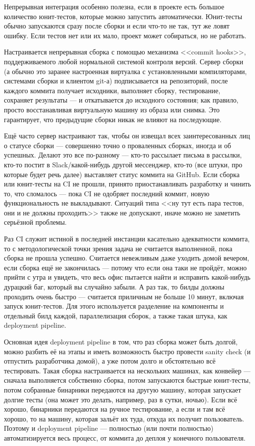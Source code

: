\documentclass{../../text-style}
\begin{document}
Непрерывная интеграция особенно полезна, если в проекте есть большое количество юнит-тестов, которые можно запустить автоматически. Юнит-тесты обычно запускаются сразу после сборки и если что-то не так, тут же ловят ошибку. Если тестов нет или их мало, проект может собираться, но не работать.

Настраивается непрерывная сборка с помощью механизма <<commit hooks>>, поддерживаемого любой нормальной системой контроля версий. Сервер сборки (а обычно это заранее настроенная виртуалка с установленными компиляторами, системами сборки и клиентом git-а) подписывается на репозиторий, после каждого коммита получает исходники, выполняет сборку, тестирование, сохраняет результаты --- и откатывается до исходного состояния; как правило, просто восстанавливая виртуальную машину из образа или снимка. Это гарантирует, что предыдущие сборки никак не влияют на последующие.

Ещё часто сервер настраивают так, чтобы он извещал всех заинтересованных лиц о статусе сборки --- совершенно точно о проваленных сборках, иногда и об успешных. Делают это все по-разному --- кто-то рассылает письма в рассылки, кто-то постит в Slack/какой-нибудь другой мессенджер, кто-то (все штуки, про которые будет речь далее) выставляет статус коммита на GitHub. Если сборка или юнит-тесты на CI не прошли, принято приостанавливать разработку и чинить то, что сломалось --- пока CI не одобряет последний коммит, новую функциональность не выкладывают. Ситуаций типа <<ну тут есть пара тестов, они и не должны проходить>> также не допускают, иначе можно не заметить серьёзной проблемы.

Раз CI служит истиной в последней инстанции касательно адекватности коммита, то с методологической точки зрения задача не считается выполненной, пока сборка не прошла успешно. Считается невежливым даже уходить домой вечером, если сборка ещё не закончилась --- потому что если она таки не пройдёт, можно прийти с утра и увидеть, что весь офис пытается найти и исправить какой-нибудь дурацкий баг, который вы случайно забыли. А раз так, то билды должны проходить очень быстро --- считается приличным не больше 10 минут, включая запуск юнит-тестов. Для этого используется разделение на компоненты и отдельный билд каждой, параллелизация сборок, а также такая штука, как deployment pipeline.

Основная идея deployment pipeline в том, что раз сборка может быть долгой, можно разбить её на этапы и иметь возможность быстро провести sanity check (и отпустить разработчика домой), а уже потом долго и обстоятельно всё тестировать. Такая сборка настраивается на нескольких машинах, как конвейер --- сначала выполняется собственно сборка, потом запускаются быстрые юнит-тесты, потом собранные бинарники передаются на другую машину, которая запускает долгие тесты (она может это делать, например, раз в сутки, ночью). Если всё хорошо, бинарники передаются на ручное тестирование, а если и там всё хорошо, то на машину, которая зальёт их туда, откуда их получит пользователь. Поэтому и deployment pipeline --- полностью (или почти полностью) автоматизируется весь процесс, от коммита до деплоя у конечного пользователя.
\end{document}
